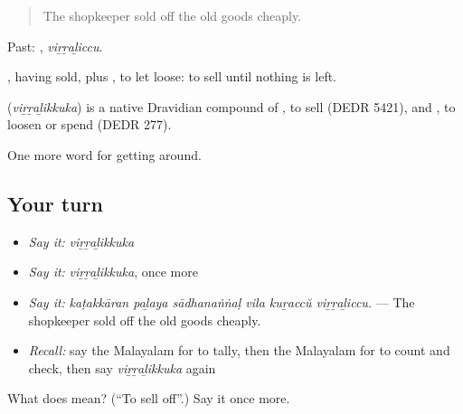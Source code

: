 \begin{quote}
The shopkeeper sold off the old goods cheaply.
\end{quote}

Past: , \emph{viṟṟaḻiccu}.

, having sold, plus , to let loose: to sell until nothing is left.

\begin{cousinweb}
\textbf{} (\emph{viṟṟaḻikkuka}) is a native Dravidian compound of , to sell (DEDR 5421), and , to loosen or spend (DEDR 277).
\end{cousinweb}

\begin{grammarlens}[title={What you've built}]
One more word for getting around.
\end{grammarlens}

\subsection*{Your turn}
\begin{itemize}
\raggedright
  \item \emph{Say it:} \emph{viṟṟaḻikkuka}
  \item \emph{Say it:} \emph{viṟṟaḻikkuka}, once more
  \item \emph{Say it:} \emph{kaṭakkāran paḻaya sādhanaṅṅaḷ vila kuṟaccŭ viṟṟaḻiccu.} — The shopkeeper sold off the old goods cheaply.
  \item \emph{Recall:} say the Malayalam for to tally, then the Malayalam for to count and check, then say \emph{viṟṟaḻikkuka} again
\end{itemize}

\begin{tcolorbox}[breakable,colback=teal!4,colframe=teal!35!black,title={Before you move on}]
What does  mean? (\textquotedblleft{}To sell off\textquotedblright{}.) Say it once more.
\end{tcolorbox}
